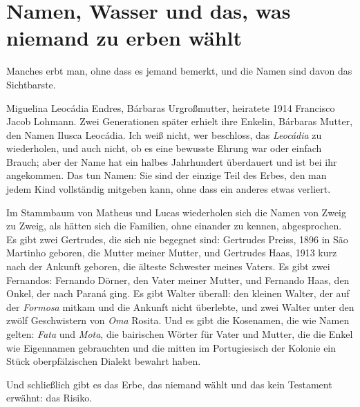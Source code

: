 \documentclass[
  ngerman,
  11pt,
  openany]{book}
\begin{document}
\section{Namen, Wasser und das, was niemand zu erben
wählt}\label{namen-wasser-und-das-was-niemand-zu-erben-wuxe4hlt}

Manches erbt man, ohne dass es jemand bemerkt, und die Namen sind davon
das Sichtbarste.

Miguelina Leocádia Endres, Bárbaras Urgroßmutter, heiratete 1914
Francisco Jacob Lohmann. Zwei Generationen später erhielt ihre Enkelin,
Bárbaras Mutter, den Namen Ilusca Leocádia. Ich weiß nicht, wer
beschloss, das \emph{Leocádia} zu wiederholen, und auch nicht, ob es
eine bewusste Ehrung war oder einfach Brauch; aber der Name hat ein
halbes Jahrhundert überdauert und ist bei ihr angekommen. Das tun Namen:
Sie sind der einzige Teil des Erbes, den man jedem Kind vollständig
mitgeben kann, ohne dass ein anderes etwas verliert.

Im Stammbaum von Matheus und Lucas wiederholen sich die Namen von Zweig
zu Zweig, als hätten sich die Familien, ohne einander zu kennen,
abgesprochen. Es gibt zwei Gertrudes, die sich nie begegnet sind:
Gertrudes Preiss, 1896 in São Martinho geboren, die Mutter meiner
Mutter, und Gertrudes Haas, 1913 kurz nach der Ankunft geboren, die
älteste Schwester meines Vaters. Es gibt zwei Fernandos: Fernando
Dörner, den Vater meiner Mutter, und Fernando Haas, den Onkel, der nach
Paraná ging. Es gibt Walter überall: den kleinen Walter, der auf der
\emph{Formosa} mitkam und die Ankunft nicht überlebte, und zwei Walter
unter den zwölf Geschwistern von \emph{Oma} Rosita. Und es gibt die
Kosenamen, die wie Namen gelten: \emph{Fata} und \emph{Mota}, die
bairischen Wörter für Vater und Mutter, die die Enkel wie Eigennamen
gebrauchten und die mitten im Portugiesisch der Kolonie ein Stück
oberpfälzischen Dialekt bewahrt haben.

Und schließlich gibt es das Erbe, das niemand wählt und das kein
Testament erwähnt: das Risiko.
\end{document}
